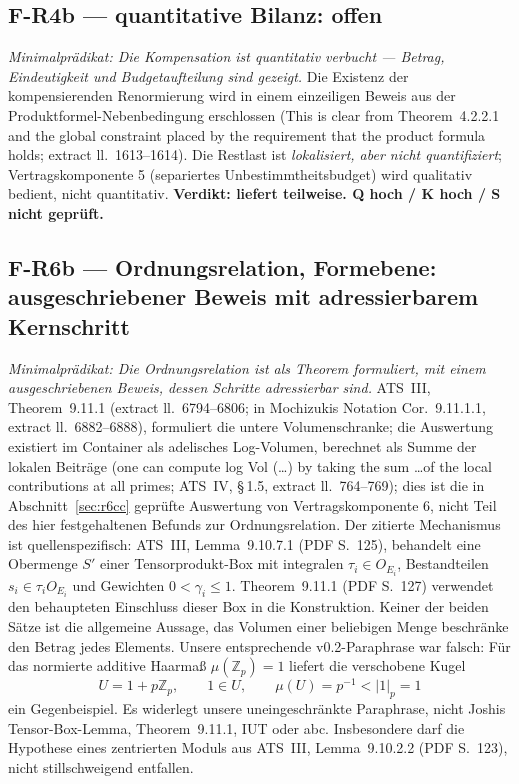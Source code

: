 \documentclass[11pt,a4paper]{article}
\begin{document}
\subsection{F-R4b --- quantitative Bilanz: offen}\label{sec:r4b}

\emph{Minimalprädikat: Die Kompensation ist quantitativ verbucht --- Betrag,
Eindeutigkeit und Budgetaufteilung sind gezeigt.} Die Existenz der
kompensierenden Renormierung wird in einem einzeiligen Beweis aus der
Produktformel-Nebenbedingung erschlossen (\glqq This is clear from
Theorem~4.2.2.1 and the global constraint placed by the requirement that the
product formula holds\grqq{}; extract ll.~1613--1614).
Die Restlast ist \emph{lokalisiert, aber nicht quantifiziert};
Vertragskomponente 5 (separiertes Unbestimmtheitsbudget) wird qualitativ
bedient, nicht quantitativ.
\textbf{Verdikt: liefert teilweise. Q hoch / K hoch / S nicht geprüft.}

\subsection{F-R6b --- Ordnungsrelation, Formebene: ausgeschriebener Beweis mit
adressierbarem Kernschritt}\label{sec:r6f}

\emph{Minimalprädikat: Die Ordnungsrelation ist als Theorem formuliert, mit
einem ausgeschriebenen Beweis, dessen Schritte adressierbar sind.} ATS~III,
Theorem~9.11.1 (extract ll.~6794--6806; in Mochizukis Notation Cor.~9.11.1.1,
extract ll.~6882--6888), formuliert die untere Volumenschranke; die Auswertung
existiert im Container als adelisches Log-Volumen, berechnet als Summe der
lokalen Beiträge (\glqq one can compute log Vol (\dots) by taking the sum \dots of
the local contributions at all primes\grqq{}; ATS~IV, \S\,1.5, extract ll.~764--769);
dies ist die in Abschnitt~\ref{sec:r6cc} geprüfte Auswertung von
Vertragskomponente 6, nicht Teil des hier festgehaltenen Befunds zur
Ordnungsrelation. Der zitierte Mechanismus ist quellenspezifisch:
ATS~III, Lemma~9.10.7.1 (PDF S.~125), behandelt eine Obermenge $S'$
einer Tensorprodukt-Box mit integralen $\tau_i\in O_{E_i}$,
Bestandteilen $s_i\in\tau_i O_{E_i}$ und Gewichten
$0<\gamma_i\le1$. Theorem~9.11.1 (PDF S.~127) verwendet den
behaupteten Einschluss dieser Box in die Konstruktion.
Keiner der beiden Sätze ist die allgemeine Aussage, das
Volumen einer beliebigen Menge beschränke den Betrag jedes Elements.
Unsere entsprechende v0.2-Paraphrase war falsch: Für das normierte
additive Haarmaß $\mu(\mathbb Z_p)=1$ liefert die verschobene Kugel
\[
 U=1+p\mathbb Z_p,\qquad 1\in U,\qquad
 \mu(U)=p^{-1}<|1|_p=1
\]
ein Gegenbeispiel. Es widerlegt unsere uneingeschränkte Paraphrase,
nicht Joshis Tensor-Box-Lemma, Theorem~9.11.1, IUT oder abc.
Insbesondere darf die Hypothese eines zentrierten Moduls aus ATS~III,
Lemma~9.10.2.2 (PDF S.~123), nicht stillschweigend entfallen.
\end{document}
